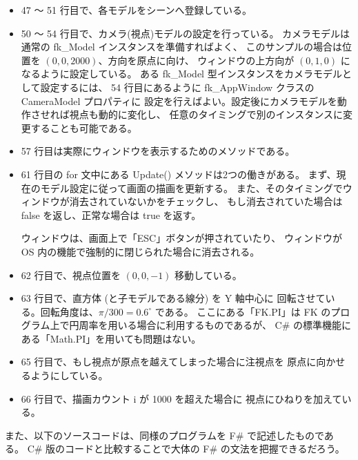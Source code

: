 \begin{itemize}
\item 47 〜 51 行目で、各モデルをシーンへ登録している。

\item 50 〜 54 行目で、カメラ(視点)モデルの設定を行っている。
	カメラモデルは通常の fk\_Model インスタンスを準備すればよく、
	このサンプルの場合は位置を	\((0,0, 2000)\)、方向を原点に向け、
	ウィンドウの上方向が \((0, 1, 0)\) になるように設定している。
	ある fk\_Model 型インスタンスをカメラモデルとして設定するには、
	54 行目にあるように fk\_AppWindow クラスの CameraModel プロパティに
	設定を行えばよい。設定後にカメラモデルを動作させれば視点も動的に変化し、
	任意のタイミングで別のインスタンスに変更することも可能である。
	
\item 57 行目は実際にウィンドウを表示するためのメソッドである。

\item 61 行目の for 文中にある Update() メソッドは2つの働きがある。
	まず、現在のモデル設定に従って画面の描画を更新する。
	また、そのタイミングでウィンドウが消去されていないかをチェックし、
	もし消去されていた場合は false を返し、正常な場合は true を返す。

	ウィンドウは、画面上で「ESC」ボタンが押されていたり、
	ウィンドウが OS 内の機能で強制的に閉じられた場合に消去される。

 \item 62 行目で、視点位置を \((0, 0, -1)\) 移動している。
 \item 63 行目で、直方体 (と子モデルである線分) を Y 軸中心に
	回転させている。回転角度は、\(\pi/300 = 0.6 ^{\circ}\) である。
	ここにある「FK.PI」は FK のプログラム上で円周率を用いる場合に利用するものであるが、
	C\# の標準機能にある「Math.PI」を用いても問題はない。
 \item 65 行目で、もし視点が原点を越えてしまった場合に注視点を
	原点に向かせるようにしている。
 \item 66 行目で、描画カウント i が 1000 を超えた場合に
	視点にひねりを加えている。
\end{itemize}

また、以下のソースコードは、同様のプログラムを F\# で記述したものである。
C\# 版のコードと比較することで大体の F\# の文法を把握できるだろう。\\ ~

